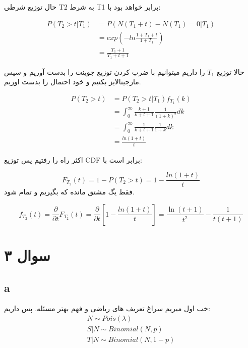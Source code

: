 \documentclass{article}[12pt]
\begin{document}
حال توزیع شرطی T2 به شرط T1
برابر خواهد بود با:

\begin{equation}
\begin{split}
P(T_2 > t | T_1) &= P(N(T_1 + t)-N(T_1) =0|T_1) \\
&= exp(- ln\frac{1+T_1+t}{1+T_1}) \\
&= 
\frac{T_1+1}{T_1+t+1}
\end{split}
\end{equation}

حالا توزیع 
$T_1$ را
داریم میتوانیم با ضرب کردن توزیع جوینت را بدست آوریم  و سپس مارجینالایز بکنیم و خود احتمال را بدست اوریم.

\begin{equation}
\begin{split}
P(T_2 > t) &= P(T_2 >t | T_1 ) f_{T_1}(k) \\ 
&= 
\int_0^{\infty} \frac{k+1}{k+t+1} 
\frac{1}{(1+k)^2}dk 
\\
&= \int_0^{\infty} \frac{1}{k+t+1} 
\frac{1}{1+k}dk 
\\
&= \frac{ln(1+t)}{t}
\end{split}
\end{equation}

اکثر راه را رفتیم پس توزیع 
CDF 
برابر است با:

\begin{equation}
F_{T_2}(t) = 1-P(T_2>t) = 1-\frac{ln(1+t)}{t}
\end{equation}
فقط یگ مشتق مانده که بگیریم و تمام شود. 

\begin{equation}
f_{T_2}(t) = \frac{\partial}{\partial t} F_{T_2}(t) = \frac{\partial}{\partial t} [1-\frac{ln(1+t)}{t}] = \dfrac{\ln\left(t+1\right)}{t^2}-\dfrac{1}{t\left(t+1\right)}
\end{equation}

\section{سوال ۳}
\subsection{a}
خب اول میریم سراغ تعریف های ریاضی و فهم بهتر مسئله. پس داریم:
\begin{gather}
N \sim Pois(\lambda) \\
S | N \sim Binomial(N,p)\\
T | N \sim Binomial(N,1-p)
\end{gather}
\end{document}
